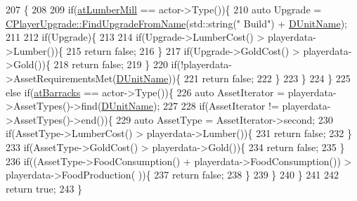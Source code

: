 \begin{DoxyCode}
207                                                                                                            
                     \{
208     
209     \textcolor{keywordflow}{if}(\hyperlink{GameDataTypes_8h_a5600d4fc433b83300308921974477feca7bb38316bc3193b5c9ec67ea6aad549c}{atLumberMill} == actor->Type())\{
210         \textcolor{keyword}{auto} Upgrade = \hyperlink{classCPlayerUpgrade_af47a08aba3a1a5b2cefacef24065a82e}{CPlayerUpgrade::FindUpgradeFromName}(std::string(\textcolor{stringliteral}{"
      Build"}) + \hyperlink{classCPlayerCapabilityBuildRanger_a4e85674699365fe1e77bcb2a1996d7ba}{DUnitName});
211         
212         \textcolor{keywordflow}{if}(Upgrade)\{
213     
214             \textcolor{keywordflow}{if}(Upgrade->LumberCost() > playerdata->Lumber())\{
215                 \textcolor{keywordflow}{return} \textcolor{keyword}{false};   
216             \}
217             \textcolor{keywordflow}{if}(Upgrade->GoldCost() > playerdata->Gold())\{
218                 \textcolor{keywordflow}{return} \textcolor{keyword}{false};   
219             \}
220             \textcolor{keywordflow}{if}(!playerdata->AssetRequirementsMet(\hyperlink{classCPlayerCapabilityBuildRanger_a4e85674699365fe1e77bcb2a1996d7ba}{DUnitName}))\{
221                 \textcolor{keywordflow}{return} \textcolor{keyword}{false};
222             \}
223         \}
224     \}
225     \textcolor{keywordflow}{else} \textcolor{keywordflow}{if}(\hyperlink{GameDataTypes_8h_a5600d4fc433b83300308921974477feca1cbf6c944f30d615a247eef1f57b2230}{atBarracks} == actor->Type())\{
226         \textcolor{keyword}{auto} AssetIterator = playerdata->AssetTypes()->find(\hyperlink{classCPlayerCapabilityBuildRanger_a4e85674699365fe1e77bcb2a1996d7ba}{DUnitName});
227         
228         \textcolor{keywordflow}{if}(AssetIterator != playerdata->AssetTypes()->end())\{
229             \textcolor{keyword}{auto} AssetType = AssetIterator->second;
230             \textcolor{keywordflow}{if}(AssetType->LumberCost() > playerdata->Lumber())\{
231                 \textcolor{keywordflow}{return} \textcolor{keyword}{false};   
232             \}
233             \textcolor{keywordflow}{if}(AssetType->GoldCost() > playerdata->Gold())\{
234                 \textcolor{keywordflow}{return} \textcolor{keyword}{false};   
235             \}
236             \textcolor{keywordflow}{if}((AssetType->FoodConsumption() + playerdata->FoodConsumption()) > playerdata->FoodProduction(
      ))\{
237                 \textcolor{keywordflow}{return} \textcolor{keyword}{false};    
238             \}
239         \}
240     \}
241     
242     \textcolor{keywordflow}{return} \textcolor{keyword}{true};
243 \}
\end{DoxyCode}
